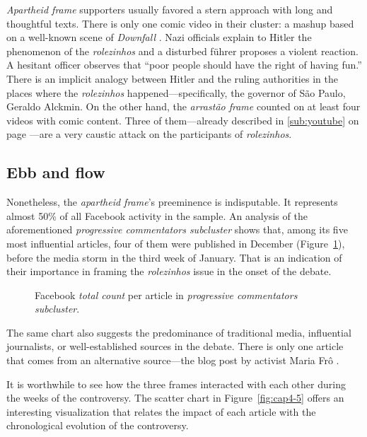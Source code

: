 \emph{Apartheid frame} supporters usually favored a stern approach with long and thoughtful texts. There is only one comic video in their cluster: a mashup based on a well-known scene of \emph{Downfall} \autocite{hitler_rolezinhos}. Nazi officials explain to Hitler the phenomenon of the \emph{rolezinhos} and a disturbed führer proposes a violent reaction. A hesitant officer observes that \enquote{poor people should have the right of having fun.} There is an implicit analogy between Hitler and the ruling authorities in the places where the \emph{rolezinhos} happened---specifically, the governor of São Paulo, Geraldo Alckmin. On the other hand, the \emph{arrastão frame} counted on at least four videos with comic content. Three of them---already described in \autoref{sub:youtube}  on page \pageref{sub:youtube}---are a very caustic attack on the participants of \emph{rolezinhos}.

\subsection*{Ebb and flow}

Nonetheless, the \emph{apartheid frame}'s preeminence is indisputable. It represents almost 50\% of all Facebook activity in the sample. An analysis of the aforementioned \emph{progressive commentators subcluster} shows that, among its five most influential articles, four of them were published in December (Figure~\ref{fig:cap4-4}), before the media storm in the third week of January. That is an indication of their importance in framing the \emph{rolezinhos} issue in the onset of the debate.

\begin{figure}
\centering

\caption{Facebook \emph{total count} per article in \emph{progressive commentators subcluster}.}\label{fig:cap4-4}
\end{figure} 

The same chart also suggests the predominance of traditional media, influential journalists, or well-established sources in the debate. There is only one article that comes from an alternative source---the blog post by activist Maria Frô \autocite{maria_fro}.

It is worthwhile to see how the three frames interacted with each other during the weeks of the controversy. The scatter chart in Figure~\ref{fig:cap4-5} offers an interesting visualization that relates the impact of each article with the chronological evolution of the controversy.

